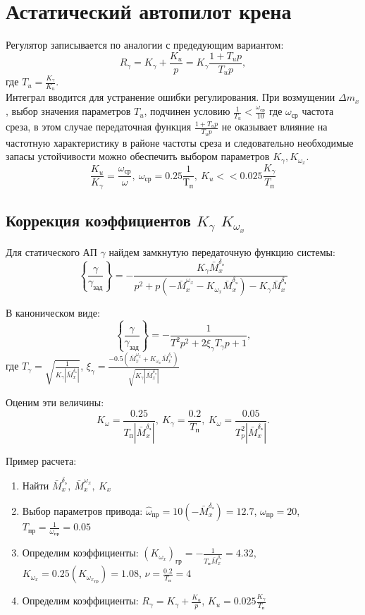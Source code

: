 \documentclass{article}
\begin{document}
\section{Астатический автопилот крена}
Регулятор записывается по аналогии с предедующим вариантом:
\[
	R_\gamma = K_\gamma +\frac{K_u}{p}  = K_\gamma\frac{1 + T_u p}{T_u p},
\]
где $T_u  = \frac{K_\gamma}{K_u}$.\\
Интеграл вводится для устранение ошибки регулирования. При возмущении $\Delta m_x$, выбор значения параметров $T_u$, подчинен условию $\frac{1}{T_u} < \frac{\omega_\text{ср}}{10}$ где $\omega_\text{ср}$ частота среза, в этом случае передаточная функция $\frac{1 + T_u p}{T_u p}$ не оказывает влияние на частотную характеристику в районе частоты среза и следовательно необходимые запасы устойчивости можно обеспечить выбором параметров $K_\gamma, K_{\omega_x}$.
\[
	\frac{K_u}{K_\gamma} =\frac{\omega_\text{ср}}{\omega}, \ \omega_\text{ср} = 0.25\frac{1}{Т_\text{п}}, \ K_u << 0.025\frac{K_\gamma}{T_\text{п}}
\]
\subsection{Коррекция коэффициентов $K_\gamma$ $K_{\omega_x}$}
Для статического АП $\gamma$ найдем замкнутую передаточную функцию системы:
\[
	\left\{\frac{\gamma}{\gamma_\text{зад}}\right\} = -\frac{K_\gamma \bar{M}_x^{\delta_\text{э}}}{p^2 + p(-\bar{M}_x^{\omega_x} - K_{\omega_x} \bar{M}_x^{\delta_\text{э}}) - K_{\gamma} \bar{M}_x^{\delta_\text{э}}} 
\]

В каноническом виде:
\[
	\left\{\frac{\gamma}{\gamma_\text{зад}}\right\} = -\frac{1}{T^2 p^2 + 2\xi_{\gamma} T_{\gamma} p + 1},
\]
где $T_\gamma = \sqrt{\frac{1}{K_\gamma |\bar{M}_x^{\delta_\text{э}}|}}$, $\xi_{\gamma} = \frac{-0.5(\bar{M}_x^{\omega_x} + K_{\omega_x} \bar{M}_x^{\delta_\text{э}})}{\sqrt{K_\gamma |\bar{M}_x^{\delta_\text{э}}|}}$

Оценим эти величины:
\[
	K_\omega =\frac{0.25}{T_\text{п}|\bar{M}_x^{\delta_\text{э}}|},\ K_\gamma = \frac{0.2}{T_\text{п}},\ K_\omega =\frac{0.05}{T_p^2 |\bar{M}_x^{\delta_\text{э}}|}.
\]

Пример расчета:
\begin{enumerate}
	\item Найти $\bar{M}_x ^{\delta_\text{э}},\ \bar{M}_x^{\omega_x},\ K_x$
	\item Выбор параметров привода:
	      $\hat{\omega}_\text{пр} = 10(-\bar{M}_x^{\delta_\text{э}}) =  12.7$, $\omega_\text{пр} = 20$, $T_\text{пр} = \frac{1}{\omega_\text{пр}} = 0.05$
	\item Определим коэффициенты:
	      $(K_{\omega_x})_\text{гр} = -\frac{1}{T_\text{п} \bar{M}_x^{\delta_\text{э}}}=4.32$, $K_{\omega_x} = 0.25 (K_{{\omega_x}_\text{гр}}) = 1.08$, $\nu =\frac{0.2}{T_\text{п}}=4$
	\item Определим коэффициенты: $R_\gamma = K_\gamma +\frac{K_u}{p}$, $K_u = 0.025 \frac{K_\gamma}{T_\text{п}}$
\end{enumerate}
\end{document}
